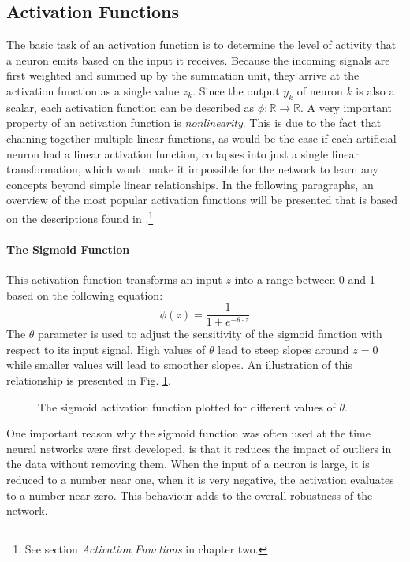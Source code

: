 \subsection{Activation Functions}
\label{sec:activation-functions}
The basic task of an activation function is to determine the level of
activity that a neuron emits based on the input it receives. Because the
incoming signals are first weighted and summed up by the summation unit, they
arrive at the activation function as a single value \(z_k\). Since the
output \(y_k\)
of neuron \(k\) is also a scalar, each activation function can be
described as \(\phi: \mathbb{R} \rightarrow \mathbb{R}\). A very
important property of an activation function is
\textit{nonlinearity}. This is due to the fact that chaining together
multiple linear functions, as would be the case if each artificial
neuron had a linear activation function, collapses into just a single
linear transformation, which would make it impossible for the network
to learn any concepts beyond simple linear relationships.
In the following paragraphs, an overview of the most popular activation
functions will be presented that is based on the descriptions found in
\cite{Patterson}.\footnote{See section \textit{Activation Functions}
  in chapter two.}

\paragraph{The Sigmoid Function}
\label{sec:sigmoid}
This activation function transforms an input \(z\) into a range between 0
and 1 based on the following equation:
\begin{equation}
  \phi(z) = \frac{1}{1 + e^{-\theta \cdot z}}
\end{equation}
The \(\theta\) parameter is used to adjust the sensitivity of the
sigmoid function with respect to its input signal. High values of \(\theta\) lead
to steep slopes around \(z=0\) while smaller values will lead to smoother
slopes. An illustration of this relationship is presented in
Fig. \ref{fig:sigmoid}.
\begin{figure}[h]
  \centering
  
  \caption{The sigmoid activation function plotted for different
    values of \(\theta\).}
  \label{fig:sigmoid}
\end{figure}
One important reason why the sigmoid function was often used at the
time neural networks were first developed, is that it reduces
the impact of outliers in the data without removing them. When the
input of a neuron is large, it is reduced to a number near one, when it
is very negative, the activation evaluates to a number near zero. This
behaviour adds to the overall robustness of the network.

